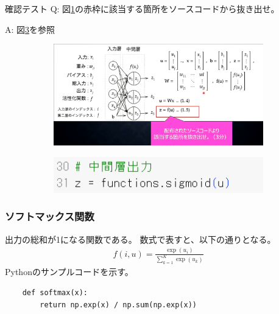 \documentclass{ltjsarticle}
\begin{document}
\begin{itembox}[l]{確認テスト}
  Q: 図\ref{fig:day1_03_1}の赤枠に該当する箇所をソースコードから抜き出せ。

  A: 図\ref{fig:day1_03_2}を参照
\end{itembox}

\begin{figure}[ht]
  \centering
  \begin{subfigure}[b]{0.45\textwidth}
    \centering
    \includegraphics[width=\textwidth]{./capture/confirm_test/day1_03_1.png}
    \caption{}
    \label{fig:day1_03_1}
  \end{subfigure}
  \hfill
  \begin{subfigure}[b]{0.45\textwidth}
    \centering
    \includegraphics[width=\textwidth]{./capture/confirm_test/day1_03_2.png}
    \caption{}
    \label{fig:day1_03_2}
  \end{subfigure}
  \caption{}
\end{figure}

\subsubsection{ソフトマックス関数}
出力の総和が1になる関数である。
数式で表すと、以下の通りとなる。
\begin{align}
  f(i,u) = \frac{\exp(u_i)}{\sum_{k=1}^{K}\exp(u_k)}
\end{align}
Pythonのサンプルコードを示す。
\begin{screen}
  \begin{verbatim}
    def softmax(x):
        return np.exp(x) / np.sum(np.exp(x))
  \end{verbatim}
\end{screen}
\end{document}
